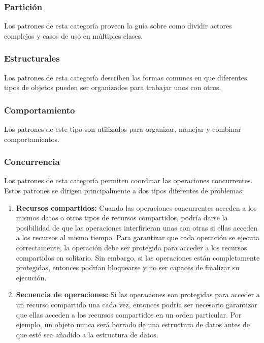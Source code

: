   \subsubsection{Partición}
  Los patrones de esta categoría proveen la guía sobre como dividir actores complejos y casos de uso en múltiples clases.
  
  \subsubsection{Estructurales}
  Los patrones de esta categoría describen las formas comunes en que diferentes tipos de objetos pueden ser organizados para trabajar unos con otros.
  
  \subsubsection{Comportamiento}
  Los patrones de este tipo son utilizados para organizar, manejar y combinar comportamientos.
  
  \subsubsection{Concurrencia}
  Los patrones de esta categoría permiten coordinar las operaciones concurrentes. Estos patrones se dirigen principalmente a dos tipos diferentes de problemas:
  \begin{enumerate}
  	\item \textbf{Recursos compartidos:}
  	Cuando las operaciones concurrentes acceden a los mismos datos o otros tipos de recursos compartidos, podría darse la posibilidad de que las operaciones interfirieran unas con otras si ellas acceden a los recursos al mismo tiempo. Para garantizar que cada operación se ejecuta correctamente, la operación debe ser protegida para acceder a los recursos compartidos en solitario. Sin embargo, si las operaciones están completamente protegidas, entonces podrían bloquearse y no ser capaces de finalizar su ejecución.
  	\item \textbf{Secuencia de operaciones:}
  	Si las operaciones son protegidas para acceder a un recurso compartido una cada vez, entonces podría ser necesario garantizar que ellas acceden a los recursos compartidos en un orden particular. Por ejemplo, un objeto nunca será borrado de una estructura de datos antes de que esté sea añadido a la estructura de datos.
  \end{enumerate}
  	
